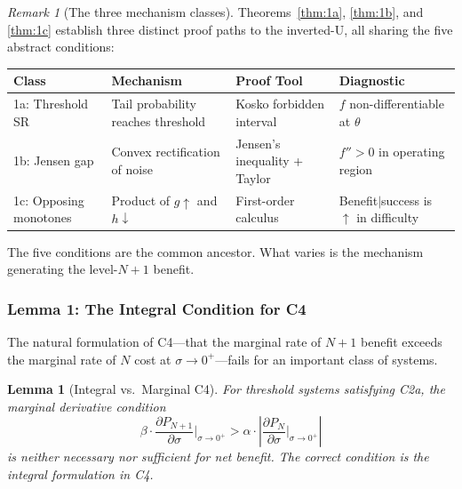 \documentclass[12pt,letterpaper]{article}
\newtheorem{lemma}[theorem]{Lemma}
\theoremstyle{definition}
\theoremstyle{remark}
\newtheorem{remark}[theorem]{Remark}
\newcommand{\Pn}{P_N}
\newcommand{\Pnp}{P_{N+1}}
\begin{document}
\begin{remark}[The three mechanism classes]
\label{rem:threeclasses}
Theorems~\ref{thm:1a}, \ref{thm:1b}, and \ref{thm:1c} establish three distinct proof paths to the inverted-U, all sharing the five abstract conditions:

\begin{center}
\begin{tabular}{@{}llll@{}}
\toprule
\textbf{Class} & \textbf{Mechanism} & \textbf{Proof Tool} & \textbf{Diagnostic} \\
\midrule
1a: Threshold SR & Tail probability reaches threshold & Kosko forbidden interval & $f$ non-differentiable at $\theta$ \\
1b: Jensen gap & Convex rectification of noise & Jensen's inequality + Taylor & $f'' > 0$ in operating region \\
1c: Opposing monotones & Product of $g\!\uparrow$ and $h\!\downarrow$ & First-order calculus & Benefit$|$success is $\uparrow$ in difficulty \\
\bottomrule
\end{tabular}
\end{center}

The five conditions are the common ancestor. What varies is the mechanism generating the level-$N{+}1$ benefit.
\end{remark}


\subsubsection{Lemma 1: The Integral Condition for C4}

The natural formulation of C4---that the marginal rate of $N{+}1$ benefit exceeds the marginal rate of $N$ cost at $\sigma \to 0^+$---fails for an important class of systems.

\begin{lemma}[Integral vs.\ Marginal C4]
\label{lem:integralC4}
For threshold systems satisfying C2a, the marginal derivative condition
\begin{equation}
\beta \cdot \frac{\partial \Pnp}{\partial \sigma}\bigg|_{\sigma \to 0^+} > \alpha \cdot \left| \frac{\partial \Pn}{\partial \sigma}\bigg|_{\sigma \to 0^+} \right|
\end{equation}
is \emph{neither necessary nor sufficient} for net benefit. The correct condition is the integral formulation in C4.
\end{lemma}
\end{document}

